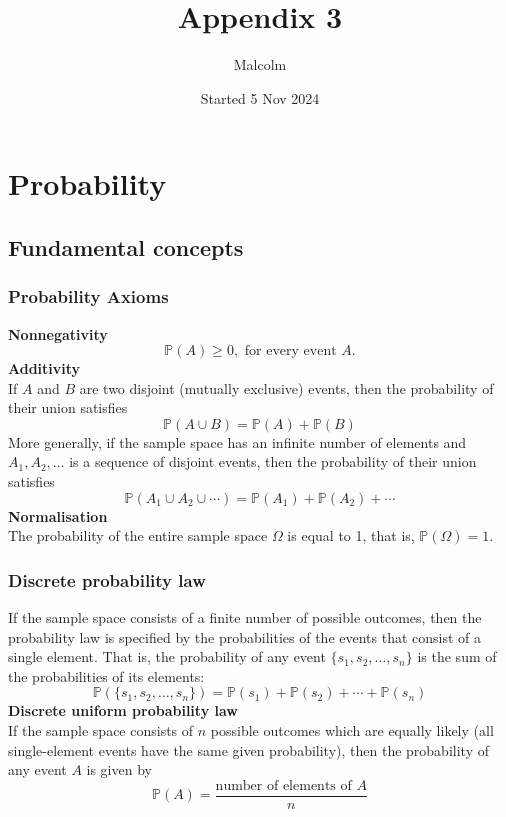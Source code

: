 \documentclass{report}
\title{Appendix 3}
\date{Started 5 Nov 2024}
\author{Malcolm}
\begin{document}
\maketitle

\tableofcontents

\appendix
\chapter{Probability}

\section{Fundamental concepts}
\subsection{Probability Axioms}
\textbf{Nonnegativity}
\begin{equation*}
\mathbb{P}(A)\geq0,\text{ for every event }A.
\end{equation*}
\textbf{Additivity}\\
If $A$ and $B$ are two disjoint (mutually exclusive) events, then the probability of their union satisfies
\begin{equation*}
\mathbb P(A\cup B)=\mathbb P(A)+\mathbb P(B)
\end{equation*}
More generally, if the sample space has an infinite number of elements and $A_1,A_2,\ldots$ is a sequence of disjoint events, then the probability of their union satisfies
\begin{equation*}
\mathbb P(A_1\cup A_2\cup\cdots)=\mathbb P(A_1)+\mathbb P(A_2)+\cdots
\end{equation*}
\textbf{Normalisation}\\
The probability of the entire sample space $\Omega$ is equal to 1, that is, $\mathbb P(\Omega)=1$.
\newpage

\subsection{Discrete probability law}
If the sample space consists of a finite number of possible outcomes, then the probability law is specified by the probabilities of the events that consist of a single element. 
That is, the probability of any event $\{s_1,s_2,\ldots,s_n\}$ is the sum of the probabilities of its elements:
\begin{equation*}
\mathbb P(\{s_1,s_2,\ldots,s_n\})=\mathbb P(s_1)+\mathbb P(s_2)+\cdots+\mathbb P(s_n)
\end{equation*}
\textbf{Discrete uniform probability law}\\
If the sample space consists of $n$ possible outcomes which are equally likely (all single-element events have the same given probability), then the probability
of any event $A$ is given by
\begin{equation*}
\mathbb P(A)=\frac{\text{number of elements of $A$}}{n}
\end{equation*}
\end{document}
